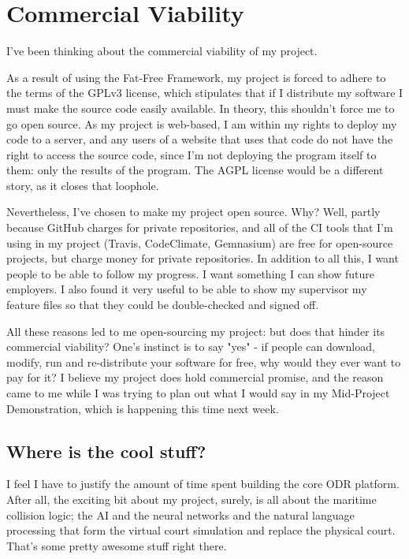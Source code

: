 \chapter{Commercial Viability} \label{appendix:commercialViability}

I've been thinking about the commercial viability of my project.

As a result of using the Fat-Free Framework, my project is forced to adhere to the terms of the GPLv3 license, which stipulates that if I distribute my software I must make the source code easily available. In theory, this shouldn't force me to go open source. As my project is web-based, I am within my rights to deploy my code to a server, and any users of a website that uses that code do not have the right to access the source code, since I'm not deploying the program itself to them: only the results of the program. The AGPL license would be a different story, as it closes that loophole.

Nevertheless, I've chosen to make my project open source. Why? Well, partly because GitHub charges for private repositories, and all of the CI tools that I'm using in my project (Travis, CodeClimate, Gemnasium) are free for open-source projects, but charge money for private repositories. In addition to all this, I want people to be able to follow my progress. I want something I can show future employers. I also found it very useful to be able to show my supervisor my feature files so that they could be double-checked and signed off.

All these reasons led to me open-sourcing my project: but does that hinder its commercial viability? One's instinct is to say "yes" - if people can download, modify, run and re-distribute your software for free, why would they ever want to pay for it? I believe my project does hold commercial promise, and the reason came to me while I was trying to plan out what I would say in my Mid-Project Demonstration, which is happening this time next week.

\section{Where is the cool stuff?}

I feel I have to justify the amount of time spent building the core ODR platform. After all, the exciting bit about my project, surely, is all about the maritime collision logic; the AI and the neural networks and the natural language processing that form the virtual court simulation and replace the physical court. That's some pretty awesome stuff right there.

